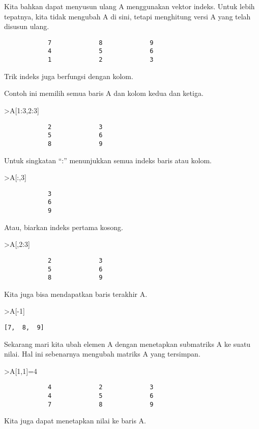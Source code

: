 \documentclass[
]{book}
\begin{document}
Kita bahkan dapat menyusun ulang A menggunakan vektor indeks. Untuk lebih tepatnya, kita tidak mengubah A di sini, tetapi menghitung versi A yang telah disusun ulang.

\begin{verbatim}
            7             8             9 
            4             5             6 
            1             2             3 
\end{verbatim}

Trik indeks juga berfungsi dengan kolom.

Contoh ini memilih semua baris A dan kolom kedua dan ketiga.

\textgreater A{[}1:3,2:3{]}

\begin{verbatim}
            2             3 
            5             6 
            8             9 
\end{verbatim}

Untuk singkatan ``:'' menunjukkan semua indeks baris atau kolom.

\textgreater A{[}:,3{]}

\begin{verbatim}
            3 
            6 
            9 
\end{verbatim}

Atau, biarkan indeks pertama kosong.

\textgreater A{[},2:3{]}

\begin{verbatim}
            2             3 
            5             6 
            8             9 
\end{verbatim}

Kita juga bisa mendapatkan baris terakhir A.

\textgreater A{[}-1{]}

\begin{verbatim}
[7,  8,  9]
\end{verbatim}

Sekarang mari kita ubah elemen A dengan menetapkan submatriks A ke suatu nilai. Hal ini sebenarnya mengubah matriks A yang tersimpan.

\textgreater A{[}1,1{]}=4

\begin{verbatim}
            4             2             3 
            4             5             6 
            7             8             9 
\end{verbatim}

Kita juga dapat menetapkan nilai ke baris A.
\end{document}
